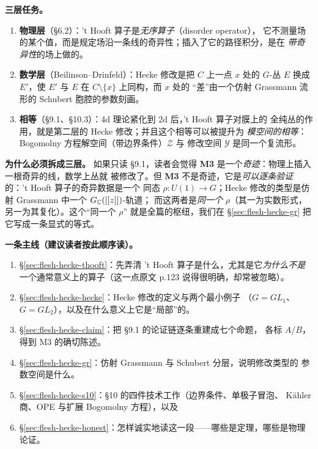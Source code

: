 \begin{keyidea}
\textbf{三层任务。}
\begin{enumerate}
\item \textbf{物理层}（§6.2）：'t Hooft{} 算子是\emph{无序算子}（disorder operator），
  它不测量场的某个值，而是规定场沿一条线的奇异性；插入了它的路径积分，是在
  \emph{带奇异性}的场上做的。\pA{}
\item \textbf{数学层}（Beilinson--Drinfeld）：Hecke 修改是把 $C$ 上一点 $x$ 处的
  $G$-丛 $E$ 换成 $E'$，使 $E'$ 与 $E$ 在 $C\setminus\{x\}$ 上同构，而 $x$ 处的
  “差”由一个仿射 Grassmann 流形的 Schubert 胞腔的参数刻画。\pA{}
\item \textbf{相等}（§9.1、§10.3）：4d 理论紧化到 2d 后，'t Hooft{} 算子对膜上的
  全纯丛的作用，就是第二层的 Hecke 修改；并且这个相等可以被提升为
  \emph{模空间的相等}：Bogomolny 方程解空间（带边界条件）$\mathcal{Z}$ 与
  修改空间 $\mathcal{Y}$ 是同一个复流形。\pA{}
\end{enumerate}
\end{keyidea}

\textbf{为什么必须拆成三层。}
如果只读 §9.1，读者会觉得 \textbf{M3} 是一个\emph{奇迹}：物理上插入一根奇异的线，数学上丛就
被修改了。但 \textbf{M3} 不是奇迹，它是\emph{可以逐条验证}的：'t Hooft{} 算子的奇异数据是一个
同态 $\rho:U(1)\to G$；Hecke 修改的类型是仿射 Grassmann 中一个 $G_{\mathbb{C}}([[z]])$-轨道；
而这两者是\emph{同一个} $\rho$（其一为实数形式，另一为其复化）。这个“同一个 $\rho$”
就是全篇的枢纽，我们在 §\ref{sec:flesh-hecke-gr} 把它写成一条显式的等式。\pB{}

\textbf{一条主线（建议读者按此顺序读）。}
\begin{enumerate}
\item §\ref{sec:flesh-hecke-thooft}：先弄清 't Hooft{} 算子是什么，尤其是它\emph{为什么不是}
  一个通常意义上的算子（这一点原文 p.123 说得很明确，却常被忽略）。
\item §\ref{sec:flesh-hecke-hecke}：Hecke 修改的定义与两个最小例子
  （$G=GL_1$、$G=GL_2$），以及在什么意义上它是“局部”的。
\item §\ref{sec:flesh-hecke-claim}：把 §9.1 的论证链逐条重建成七个命题，
  各标 $A$/$B$，得到 M3 的确切陈述。
\item §\ref{sec:flesh-hecke-gr}：仿射 Grassmann 与 Schubert 分层，说明修改类型的
  参数空间是什么。
\item §\ref{sec:flesh-hecke-s10}：§10 的四件技术工作（边界条件、单极子冒泡、
  Kähler 商、OPE 与扩展 Bogomolny 方程），以及
\item §\ref{sec:flesh-hecke-honest}：怎样诚实地读这一段——哪些是定理，哪些是物理论证。
\end{enumerate}

